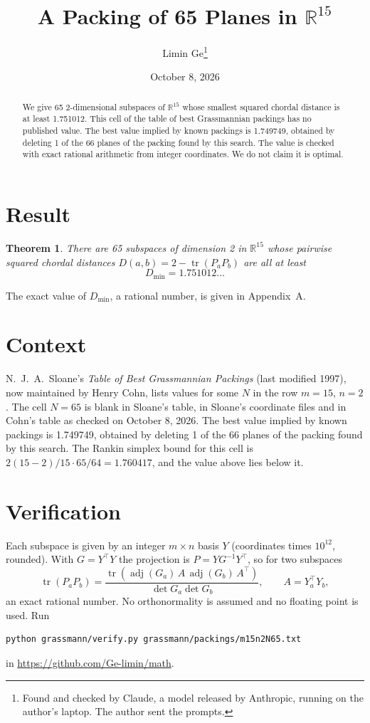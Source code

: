 \documentclass[11pt,a4paper]{article}
\title{A Packing of 65 Planes in $\mathbb{R}^{15}$}
\author{Limin Ge\thanks{Found and checked by Claude, a model released by Anthropic, running on the author's laptop. The author sent the prompts.}}
\date{October 8, 2026}
\newtheorem*{theorem}{Theorem}
\begin{document}
\maketitle
\begin{abstract}
We give 65 2-dimensional subspaces of $\mathbb{R}^{15}$ whose smallest squared chordal distance is at least 1.751012. This cell of the table of best Grassmannian packings has no published value. The best value implied by known packings is 1.749749, obtained by deleting 1 of the 66 planes of the packing found by this search. The value is checked with exact rational arithmetic from integer coordinates. We do not claim it is optimal.
\end{abstract}

\section{Result}
\begin{theorem}
There are 65 subspaces of dimension 2 in $\mathbb{R}^{15}$ whose pairwise squared chordal distances $D(a,b) = 2 - \operatorname{tr}(P_aP_b)$ are all at least
\[ D_{\min} = 1.751012\ldots \]
\end{theorem}
The exact value of $D_{\min}$, a rational number, is given in Appendix~A.


\section{Context}
N.~J.~A.~Sloane's \emph{Table of Best Grassmannian Packings} (last modified 1997), now maintained by Henry Cohn, lists values for some $N$ in the row $m=15$, $n=2$. The cell $N=65$ is blank in Sloane's table, in Sloane's coordinate files and in Cohn's table as checked on October 8, 2026. The best value implied by known packings is 1.749749, obtained by deleting 1 of the 66 planes of the packing found by this search. The Rankin simplex bound for this cell is $2(15-2)/15\cdot 65/64 = 1.760417$, and the value above lies below it.


\section{Verification}
Each subspace is given by an integer $m\times n$ basis $Y$ (coordinates times $10^{12}$, rounded). With $G=Y^\top Y$ the projection is $P=YG^{-1}Y^\top$, so for two subspaces
\[ \operatorname{tr}(P_aP_b)=\frac{\operatorname{tr}(\operatorname{adj}(G_a)\,A\,\operatorname{adj}(G_b)\,A^\top)}{\det G_a\det G_b},\qquad A=Y_a^\top Y_b, \]
an exact rational number. No orthonormality is assumed and no floating point is used. Run
\begin{verbatim}
python grassmann/verify.py grassmann/packings/m15n2N65.txt
\end{verbatim}
in \url{https://github.com/Ge-limin/math}.
\end{document}
